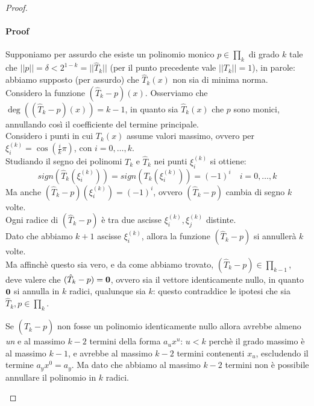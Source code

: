 \begin{proof}
\begin{itemize}
  \paragraph{Proof} Supponiamo per assurdo che esiste un polinomio monico $p
  \in \prod_{k}$ di grado $k$ tale che $||p|| = \delta < 2^{1-k} =
  ||\hat{T}_{k}||$ (per il punto precedente vale $||T_{k}|| = 1$), in parole:
  abbiamo supposto (per assurdo) che $\hat{T}_{k}(x)$ non sia di minima norma. 
  \\ Considero la funzione $(\hat{T}_{k} - p)(x)$. Osserviamo che
  $\deg((\hat{T}_{k} - p)(x)) = k-1$, in quanto sia $\hat{T}_{k}(x)$ che $p$
  sono monici, annullando cos\`i il coefficiente del termine principale.
  \\Considero i punti in cui $T_{k}(x)$ assume valori massimo, ovvero per 
  $\xi_{i}^{(k)} = \cos\left(\frac{i}{k}\pi\right)$, con $i = 0,\ldots,k$.
  \\Studiando il segno dei polinomi $T_{k}$ e $\hat{T}_{k}$ nei punti
  $\xi_{i}^{(k)}$ si ottiene: $$sign(\hat{T}_{k}(\xi_{i}^{(k)})) =
  sign(T_{k}(\xi_{i}^{(k)})) = (-1)^{i} \quad i = 0,\ldots,k$$
  Ma anche $(\hat{T}_{k} - p)(\xi_{i}^{(k)}) = (-1)^{i}$, ovvero $(\hat{T}_{k} -
  p)$ cambia di segno $k$ volte. 
  \\ Ogni radice di $(\hat{T}_{k} - p)$ \`e tra due
  ascisse $\xi_{i}^{(k)}, \xi_{j}^{(k)}$ distinte. 
  \\ Dato che abbiamo $k+1$ ascisse $\xi_{i}^{(k)}$, allora la funzione
  $(\hat{T}_{k} - p)$ si annuller\`a $k$ volte. 
  \\ Ma affinch\`e questo sia vero, e da come abbiamo trovato, $(\hat{T}_{k} -
  p) \in \prod_{k-1}$, deve valere che $(\hat{T}_{k} - p) = \boldsymbol{0}$, ovvero 
  sia il vettore identicamente nullo, in quanto $\boldsymbol{0}$ si annulla in $k$
  radici, qualunque sia $k$: questo contraddice le ipotesi che sia 
  $\hat{T}_{k}, p \in \prod_{k}$.
  
  Se $(\hat{T}_{k} - p)$ non fosse un polinomio
  identicamente nullo allora avrebbe almeno \emph{un} e al massimo $k-2$ termini
  della forma $a_{u}x^{u}$: $u < k$ perch\`e il grado massimo \`e al massimo
  $k-1$, e avrebbe al massimo $k-2$ termini contenenti $x_{u}$, escludendo il
  termine $a_{y}x^{0} = a_{y}$. Ma dato che abbiamo al massimo $k-2$ termini non
  \`e possibile annullare il polinomio in $k$ radici.
\end{itemize}
\end{proof}

